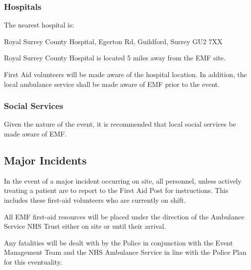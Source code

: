 \subsubsection{Hospitals}

The nearest hospital is:

Royal Surrey County Hospital, Egerton Rd, Guildford, Surrey GU2 7XX

Royal Surrey County Hospital is located 5 miles away from the EMF site.

First Aid volunteers will be made aware of the hospital location. In addition,
the local ambulance service shall be made aware of EMF prior to the event.

\subsubsection{Social Services}

Given the nature of the event, it is recommended that local social services be made aware of EMF.

\subsection{Major Incidents}

In the event of a major incident occurring on site, all personnel, unless
actively treating a patient are to report to the First Aid Post for
instructions. This includes these first-aid volunteers who are currently on
shift.

All EMF first-aid resources will be placed under the direction of the Ambulance
Service NHS Trust either on site or until their arrival.

Any fatalities will be dealt with by the Police in conjunction with the Event
Management Team and the NHS Ambulance Service in line with the Police Plan for
this eventuality.
